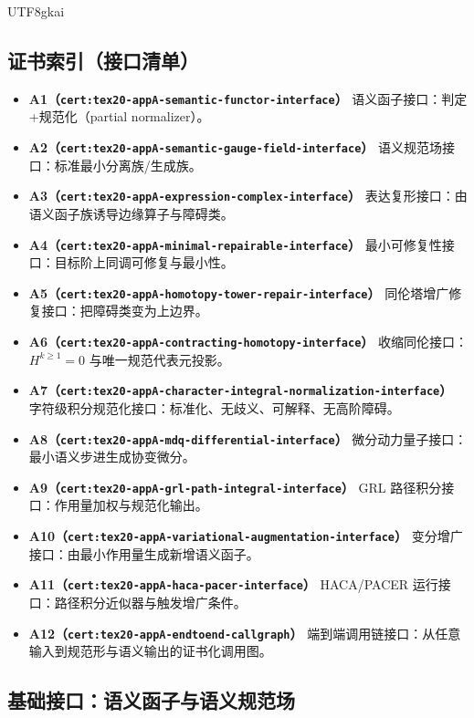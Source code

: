 \documentclass[12pt]{article}
\begin{document}
\begin{CJK*}{UTF8}{gkai}
\subsection{证书索引（接口清单）}
\label{subsec:tex20-appA-index}
\begin{itemize}
  \item \textbf{A1（\texttt{cert:tex20-appA-semantic-functor-interface}）} 语义函子接口：判定+规范化（partial normalizer）。
  \item \textbf{A2（\texttt{cert:tex20-appA-semantic-gauge-field-interface}）} 语义规范场接口：标准最小分离族/生成族。
  \item \textbf{A3（\texttt{cert:tex20-appA-expression-complex-interface}）} 表达复形接口：由语义函子族诱导边缘算子与障碍类。
  \item \textbf{A4（\texttt{cert:tex20-appA-minimal-repairable-interface}）} 最小可修复性接口：目标阶上同调可修复与最小性。
  \item \textbf{A5（\texttt{cert:tex20-appA-homotopy-tower-repair-interface}）} 同伦塔增广修复接口：把障碍类变为上边界。
  \item \textbf{A6（\texttt{cert:tex20-appA-contracting-homotopy-interface}）} 收缩同伦接口：$H^{k\ge 1}=0$ 与唯一规范代表元投影。
  \item \textbf{A7（\texttt{cert:tex20-appA-character-integral-normalization-interface}）} 字符级积分规范化接口：标准化、无歧义、可解释、无高阶障碍。
  \item \textbf{A8（\texttt{cert:tex20-appA-mdq-differential-interface}）} 微分动力量子接口：最小语义步进生成协变微分。
  \item \textbf{A9（\texttt{cert:tex20-appA-grl-path-integral-interface}）} \textsf{GRL} 路径积分接口：作用量加权与规范化输出。
  \item \textbf{A10（\texttt{cert:tex20-appA-variational-augmentation-interface}）} 变分增广接口：由最小作用量生成新增语义函子。
  \item \textbf{A11（\texttt{cert:tex20-appA-haca-pacer-interface}）} \textsf{HACA}/\textsf{PACER} 运行接口：路径积分近似器与触发增广条件。
  \item \textbf{A12（\texttt{cert:tex20-appA-endtoend-callgraph}）} 端到端调用链接口：从任意输入到规范形与语义输出的证书化调用图。
\end{itemize}

\subsection{基础接口：语义函子与语义规范场}
\label{subsec:tex20-appA-base}


\end{CJK*}
\end{document}
